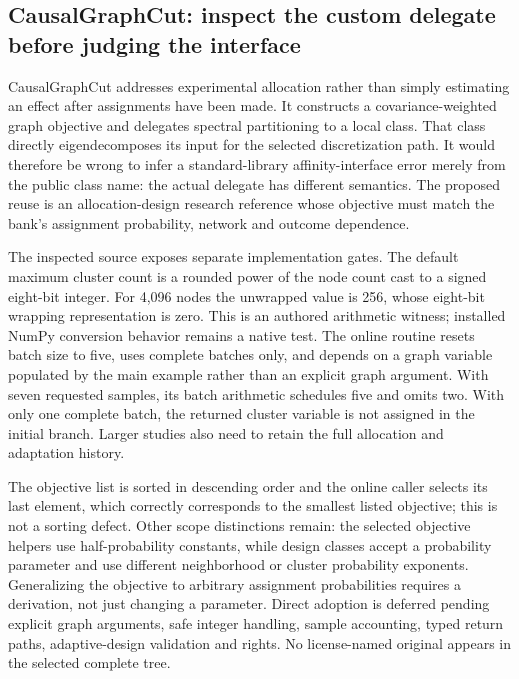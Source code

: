 \subsection{CausalGraphCut: inspect the custom delegate before judging the interface}

CausalGraphCut addresses experimental allocation rather than simply estimating an effect after assignments have been made. It constructs a covariance-weighted graph objective and delegates spectral partitioning to a local class. That class directly eigendecomposes its input for the selected discretization path. It would therefore be wrong to infer a standard-library affinity-interface error merely from the public class name: the actual delegate has different semantics. The proposed reuse is an allocation-design research reference whose objective must match the bank's assignment probability, network and outcome dependence.~\citep{exec25_pnet_cut}

The inspected source exposes separate implementation gates. The default maximum cluster count is a rounded power of the node count cast to a signed eight-bit integer. For 4,096 nodes the unwrapped value is 256, whose eight-bit wrapping representation is zero. This is an authored arithmetic witness; installed NumPy conversion behavior remains a native test. The online routine resets batch size to five, uses complete batches only, and depends on a graph variable populated by the main example rather than an explicit graph argument. With seven requested samples, its batch arithmetic schedules five and omits two. With only one complete batch, the returned cluster variable is not assigned in the initial branch. Larger studies also need to retain the full allocation and adaptation history.~\citep{exec25_pnet_cut,exec25_pnet_choice}

The objective list is sorted in descending order and the online caller selects its last element, which correctly corresponds to the smallest listed objective; this is not a sorting defect. Other scope distinctions remain: the selected objective helpers use half-probability constants, while design classes accept a probability parameter and use different neighborhood or cluster probability exponents. Generalizing the objective to arbitrary assignment probabilities requires a derivation, not just changing a parameter. Direct adoption is deferred pending explicit graph arguments, safe integer handling, sample accounting, typed return paths, adaptive-design validation and rights. No license-named original appears in the selected complete tree.~\citep{exec25_pnet_cut,exec25_pnet_choice}

